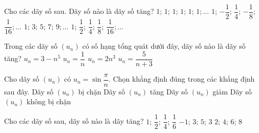 \begin{ex}%
	Cho các dãy số sau. Dãy số nào là dãy số tăng? 
	\choice 
		{$1$;  $1$; $1$; $1$; $1$; $1;\ldots$}
		 {$1$; $-\dfrac{1}{2}$; $\dfrac{1}{4}$; $-\dfrac{1}{8}$; $\dfrac{1}{16};\ldots$}
		{\True $1$; $3$; $5$;  $7$; $9;\ldots$}
		{$1$; $\dfrac{1}{2}$; $\dfrac{1}{4}$; $\dfrac{1}{8}$; $\dfrac{1}{16};\ldots$} 
\end{ex}

\begin{ex}%
	 Trong các dãy số $(u_{n})$ có số hạng tổng quát dưới đây, dãy số nào là dãy số tăng?
	\choice 
		{$u_{n}=3-n^5$} 
		 {$u_{n}=\dfrac{1}{n}$}
		{\True $u_{n}=2n^3$} 
		 {$u_{n}=\dfrac{5}{n+3}$}
\end{ex}

\begin{ex}%
	Cho dãy số $(u_n)$ có $u_n=\sin \dfrac{\pi}{n}$. Chọn  khẳng định đúng trong các khẳng định sau đây.
	 \choice
		{\True Dãy số $(u_n)$ bị chặn} 
		{Dãy số $(u_n)$ tăng} 
		{Dãy số $(u_n)$ giảm} 
		{Dãy số $(u_n)$ không bị chặn} 
\end{ex}

\begin{ex}%
	Cho các dãy số sau, dãy số  nào là dãy tăng?
		{$1$;  $\dfrac{1}{2}$; $\dfrac{1}{4}$; $\dfrac{1}{6}$}
		 {$-1$; $3$; $5$; $3$}
		{\True $2$; $4$;  $6$; $8$}
\end{ex}

